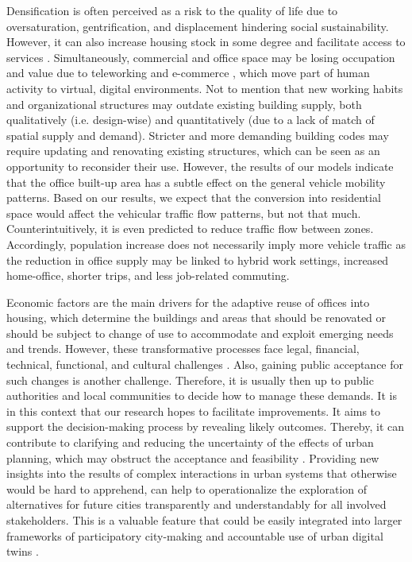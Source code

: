 Densification is often perceived as a risk to the quality of life due to oversaturation, gentrification, and displacement \citep{Rerat2010NewDebates, Chapple2017IncomeDisplacement} hindering social sustainability. However, it can also increase housing stock in some degree and facilitate access to services \citep{Neuman2005TheFallacy, Bramley2009UrbanType}. Simultaneously, commercial and office space may be losing occupation and value due to teleworking and e-commerce \citep{Le2022ImpactsReview}, which move part of human activity to virtual, digital environments. Not to mention that new working habits and organizational structures may outdate existing building supply, both qualitatively (i.e. design-wise) and quantitatively (due to a lack of match of spatial supply and demand). Stricter and more demanding building codes may require updating and renovating existing structures, which can be seen as an opportunity to reconsider their use. 
However, the results of our models indicate that the office built-up area has a subtle effect on the general vehicle mobility patterns. Based on our results, we expect that the conversion into residential space would affect the vehicular traffic flow patterns, but not that much. Counterintuitively, it is even predicted to reduce traffic flow between zones.
Accordingly, population increase does not necessarily imply more vehicle traffic as the reduction in office supply may be linked to hybrid work settings, increased home-office, shorter trips, and less job-related commuting.

Economic factors are the main drivers for the adaptive reuse of offices into housing, which determine the buildings and areas that should be renovated or should be subject to change of use to accommodate and exploit emerging needs and trends.
However, these transformative processes face legal, financial, technical, functional, and cultural challenges \citep{Remy2014}.
Also, gaining public acceptance for such changes is another challenge. Therefore, it is usually then up to public authorities and local communities to decide how to manage these demands. It is in this context that our research hopes to facilitate improvements. It aims to support the decision-making process by revealing likely outcomes. Thereby, it can contribute to clarifying and reducing the uncertainty of the effects of urban planning, which may obstruct the acceptance and feasibility \citep{Wustenhagen2007SocialConcept}. Providing new insights into the results of complex interactions in urban systems that otherwise would be hard to apprehend, can help to operationalize the exploration of alternatives for future cities transparently and understandably for all involved stakeholders. This is a valuable feature that could be easily integrated into larger frameworks of participatory city-making and accountable use of urban digital twins \citep{Helbing2023, Bettencourt2024RecentTwins, Ferre-Bigorra2022TheTwins}. 

